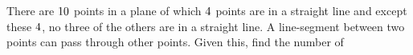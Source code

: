 



\SUBTRACT\va\vb\vz

\question There are $10$ points in a plane of which $4$ points are in a straight line 
and except these $4$, no three of the others are in a straight line. A line-segment between two points
can pass through other points. Given this, find the number of

\watchout


